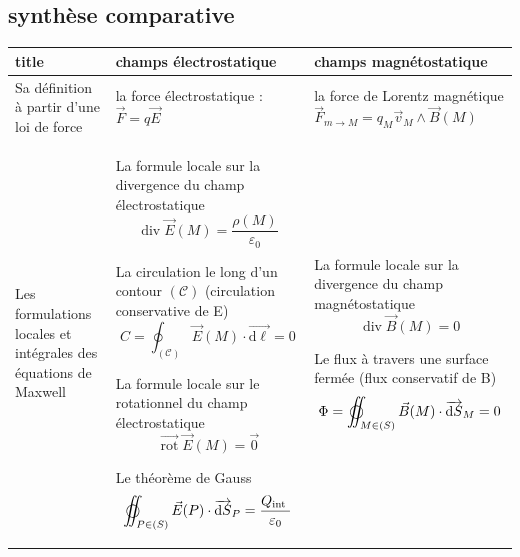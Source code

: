 \documentclass[a4paper,12pt]{book}
\begin{document}
\begin{landscape}
\renewcommand{\labelitemi}{$\blacktriangleright$}
\renewcommand{\labelitemii}{$\bullet$}


   
\section{synthèse comparative}
\begin{table}[h]
    \centering

    \begin{tabular}{|m{4cm}<{\centering}|m{10cm}<{\centering}|m{10cm}<{\centering}|}
    \hline
    title & champs électrostatique & champs magnétostatique  \\
    \hline
    Sa définition à partir d’une loi de force  &la force électrostatique :
    $\vec{F}=q\vec{E}$  &la force de Lorentz magnétique $\vec{F}_{m \rightarrow M}=q_{M} \vec{v}_{M} \wedge \vec{B}(M)$\\ \hline


    Les formulations locales et intégrales des équations de Maxwell &
    La  formule locale sur la divergence du champ électrostatique$$ \operatorname{div} \vec{E}(M)=\frac{\rho(M)}{\varepsilon_{0}}$$

    La circulation le long d'un contour $(\mathscr{C})$ (circulation conservative de E)$$C=\oint_{(\mathscr{C})} \vec{E}(M) \cdot \overrightarrow{\mathrm{d} \ell}=0$$
    
    La  formule locale sur le rotationnel du champ électrostatique $$\overrightarrow{\operatorname{rot}} \vec{E}(M)=\overrightarrow{0}$$

    Le théorème de Gauss $$\varoiint_{P \in(S)} \vec{E}(P) \cdot \overrightarrow{\mathrm{d} S}_{P}=\frac{Q_{\text {int }}}{\varepsilon_{0}}$$
    
    & 
    La  formule locale sur la divergence du champ magnétostatique $$\operatorname{div} \vec{B}(M)=0$$

    Le flux à travers une surface fermée (flux conservatif de B) $$\Phi=\varoiint_{M \in(S)} \vec{B}(M) \cdot \overrightarrow{\mathrm{d} S}_{M}=0$$
    

\end{tabular}
\end{table}
\end{landscape}
\end{document}
